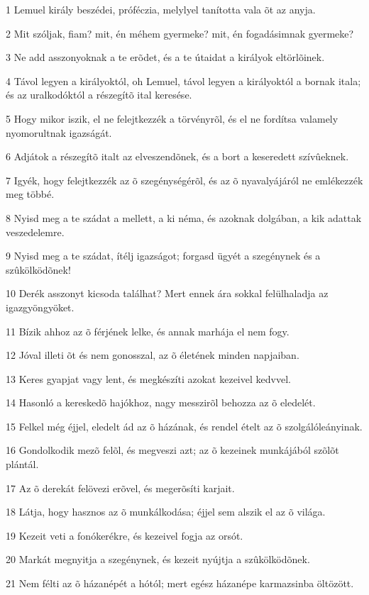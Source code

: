 \par 1 Lemuel király beszédei, próféczia, melylyel tanította vala õt az anyja.
\par 2 Mit szóljak, fiam? mit, én méhem gyermeke? mit, én fogadásimnak gyermeke?
\par 3 Ne add asszonyoknak a te erõdet, és a te útaidat a királyok eltörlõinek.
\par 4 Távol legyen a királyoktól, oh Lemuel, távol legyen a királyoktól a bornak itala; és az uralkodóktól a részegítõ ital keresése.
\par 5 Hogy mikor iszik, el ne felejtkezzék a törvényrõl, és el ne fordítsa valamely nyomorultnak igazságát.
\par 6 Adjátok a részegítõ italt az elveszendõnek, és a bort a keseredett szívûeknek.
\par 7 Igyék, hogy felejtkezzék az õ szegénységérõl, és az õ nyavalyájáról ne emlékezzék meg többé.
\par 8 Nyisd meg a te szádat a mellett, a ki néma, és azoknak dolgában, a kik adattak veszedelemre.
\par 9 Nyisd meg a te szádat, ítélj igazságot; forgasd ügyét a szegénynek és a szûkölködõnek!
\par 10 Derék asszonyt kicsoda találhat? Mert ennek ára sokkal felülhaladja az igazgyöngyöket.
\par 11 Bízik ahhoz az õ férjének lelke, és annak marhája el nem fogy.
\par 12 Jóval illeti õt és nem gonosszal, az õ életének minden napjaiban.
\par 13 Keres gyapjat vagy lent, és megkészíti azokat kezeivel kedvvel.
\par 14 Hasonló a kereskedõ hajókhoz, nagy messzirõl behozza az õ eledelét.
\par 15 Felkel még éjjel, eledelt ád az õ házának, és rendel ételt az õ szolgálóleányinak.
\par 16 Gondolkodik mezõ felõl, és megveszi azt; az õ kezeinek munkájából szõlõt plántál.
\par 17 Az õ derekát felövezi erõvel, és megerõsíti karjait.
\par 18 Látja, hogy hasznos az õ munkálkodása; éjjel sem alszik el az õ világa.
\par 19 Kezeit veti a fonókerékre, és kezeivel fogja az orsót.
\par 20 Markát megnyitja a szegénynek, és kezeit nyújtja a szûkölködõnek.
\par 21 Nem félti az õ házanépét a hótól; mert egész házanépe karmazsinba öltözött.
